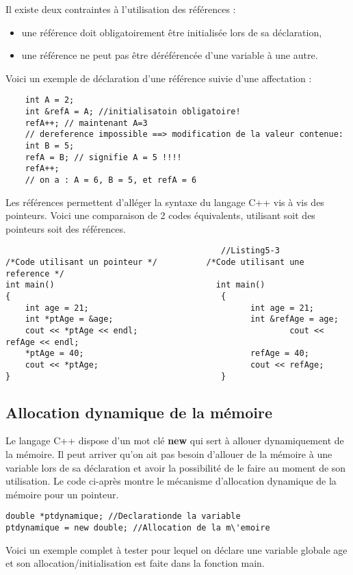 \documentclass[a4paper, oneside,11pt]{book}
\begin{document}
Il existe deux contraintes \`a l'utilisation des r\'ef\'erences :

\begin{itemize}
\item une r\'ef\'erence doit obligatoirement \^etre initialis\'ee lors de sa d\'eclaration,
\item une r\'ef\'erence ne peut pas \^etre d\'er\'ef\'erenc\'ee d'une variable \`a une autre.
\end{itemize}

Voici un exemple de d\'eclaration d'une r\'ef\'erence suivie d'une affectation :




\begin{lstlisting}
    int A = 2;
    int &refA = A; //initialisatoin obligatoire!
    refA++; // maintenant A=3
    // dereference impossible ==> modification de la valeur contenue:
    int B = 5;
    refA = B; // signifie A = 5 !!!!
    refA++;
    // on a : A = 6, B = 5, et refA = 6
\end{lstlisting}


Les r\'ef\'erences permettent d'all\'eger la syntaxe du langage C++ vis \`a vis des pointeurs. Voici une
comparaison de 2 codes \'equivalents, utilisant soit des pointeurs soit des r\'ef\'erences. 




\begin{verbatim}
                                            //Listing5-3
/*Code utilisant un pointeur */          /*Code utilisant une reference */
int main()                                 int main()
{                                           {
    int age = 21;                                 int age = 21;
    int *ptAge = &age;                            int &refAge = age;
    cout << *ptAge << endl;                               cout << refAge << endl;
    *ptAge = 40;                                  refAge = 40;
    cout << *ptAge;                               cout << refAge;
}                                           }
\end{verbatim}

\subsection{Allocation dynamique de la m\'emoire}

Le langage C++ dispose d'un mot cl\'e \textbf{new} qui sert \`a allouer dynamiquement 
de la m\'emoire. Il peut arriver qu'on ait pas besoin d'allouer de la m\'emoire \`a 
une variable lors de sa d\'eclaration et avoir la possibilit\'e de le faire 
au moment de son utilisation. Le code ci-apr\`es montre le m\'ecanisme d'allocation
dynamique de la m\'emoire
pour un pointeur.
\begin{lstlisting}
double *ptdynamique; //Declarationde la variable
ptdynamique = new double; //Allocation de la m\'emoire
\end{lstlisting}
Voici un exemple complet \`a tester pour lequel on d\'eclare une variable globale age et son allocation/initialisation est faite dans la fonction main.
\end{document}
